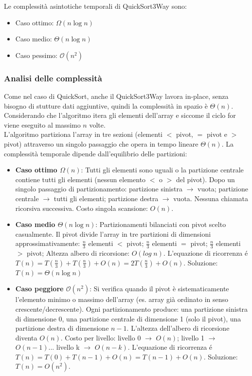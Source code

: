 \documentclass[a4paper, 11pt]{article}
\begin{document}
\bigskip

Le complessità asintotiche temporali di QuickSort3Way sono:
\begin{itemize}
    \item Caso ottimo: $\Omega(n\log n)$
    \item Caso medio: $\Theta(n\log n)$
    \item Caso pessimo: $\mathcal{O}(n^2)$
\end{itemize}

\subsubsection{Analisi delle complessità}
Come nel caso di QuickSort, anche il QuickSort3Way lavora in-place, senza bisogno di stutture dati aggiuntive, quindi la complessità in spazio è $\Theta(n)$.\\
Considerando che l'algoritmo itera gli elementi dell'array e siccome il ciclo for viene eseguito al massimo $n$ volte.\\
L'algoritmo partiziona l'array in tre sezioni (elementi $<$ pivot, $=$ pivot e $>$ pivot) attraverso un singolo passaggio che opera in tempo lineare $\Theta(n)$. La complessità temporale dipende dall'equilibrio delle partizioni:
\begin{itemize}
    \item \textbf{Caso ottimo $\Omega(n)$}: Tutti gli elementi sono uguali o la partizione centrale contiene tutti gli elementi (nessun elemento $<$ o $>$ del pivot). Dopo un singolo passaggio di partizionamento: partizione sinistra $\rightarrow$ vuota; partizione centrale $\rightarrow$ tutti gli elementi; partizione destra $\rightarrow$ vuota. Nessuna chiamata ricorsiva successiva. Costo singola scansione: $O(n)$.
    \item \textbf{Caso medio $\Theta(n \log n)$}: Partizionamenti bilanciati con pivot scelto casualmente. Il pivot divide l'array in tre partizioni di dimensioni approssimativamente: $\frac{n}{3}$ elementi $<$ pivot; $\frac{n}{3}$ elementi $=$ pivot; $\frac{n}{3}$ elementi $>$ pivot; Altezza albero di ricorsione: $O(log\;n)$. L'equazione di ricorrenza é $T(n) = T\left(\frac{n}{3}\right) + T\left(\frac{n}{3}\right) + O(n) = 2T\left(\frac{n}{3}\right) + O(n)$. Soluzione: $T(n) = \Theta(n \log n)$
    \item \textbf{Caso peggiore $\mathcal{O}(n^2)$}: Si verifica quando il pivot è sistematicamente l'elemento minimo o massimo dell'array (es. array già ordinato in senso crescente/decrescente). Ogni partizionamento produce: una partizione sinistra di dimensione 0, una partizione centrale di dimensione 1 (solo il pivot), una partizione destra di dimensione $n-1$. L'altezza dell'albero di ricorsione diventa $O(n)$. Costo per livello: livello 0 $\rightarrow$ $O(n)$; livello 1 $\rightarrow$ $O(n-1)$... livello k $\rightarrow$ $O(n-k)$. L'equazione di ricorrenza é $T(n) = T(0) + T(n-1) + O(n) = T(n-1) + O(n)$. Soluzione: $T(n) = O(n^2)$.
\end{itemize}
\end{document}
